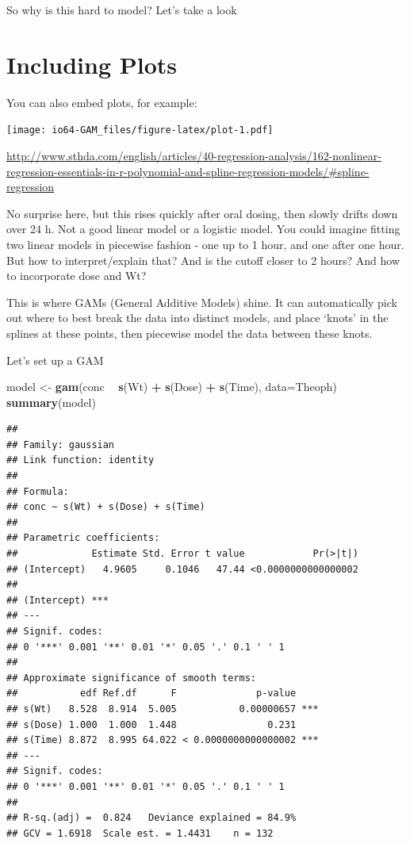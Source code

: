 \documentclass[
]{book}
\newenvironment{Shaded}{\begin{snugshade}}{\end{snugshade}}
\newcommand{\DataTypeTok}[1]{\textcolor[rgb]{0.13,0.29,0.53}{#1}}
\newcommand{\KeywordTok}[1]{\textcolor[rgb]{0.13,0.29,0.53}{\textbf{#1}}}
\newcommand{\NormalTok}[1]{#1}
\newcommand{\OperatorTok}[1]{\textcolor[rgb]{0.81,0.36,0.00}{\textbf{#1}}}
\newcommand{\StringTok}[1]{\textcolor[rgb]{0.31,0.60,0.02}{#1}}
\begin{document}
So why is this hard to model?
Let's take a look

\hypertarget{including-plots}{%
\section{Including Plots}\label{including-plots}}

You can also embed plots, for example:

\texttt{[image: io64-GAM\_files/figure-latex/plot-1.pdf]}

\url{http://www.sthda.com/english/articles/40-regression-analysis/162-nonlinear-regression-essentials-in-r-polynomial-and-spline-regression-models/\#spline-regression}

No surprise here, but this rises quickly after oral dosing, then slowly drifts down over 24 h. Not a good linear model or a logistic model.
You could imagine fitting two linear models in piecewise fashion - one up to 1 hour, and one after one hour.
But how to interpret/explain that?
And is the cutoff closer to 2 hours?
And how to incorporate dose and Wt?

This is where GAMs (General Additive Models) shine.
It can automatically pick out where to best break the data into distinct models, and place `knots' in the splines at these points, then piecewise model the data between these knots.

Let's set up a GAM

\begin{Shaded}
\begin{Highlighting}[]
\NormalTok{model <-}\StringTok{ }\KeywordTok{gam}\NormalTok{(conc }\OperatorTok{~}\StringTok{ }\KeywordTok{s}\NormalTok{(Wt) }\OperatorTok{+}\StringTok{ }\KeywordTok{s}\NormalTok{(Dose) }\OperatorTok{+}\StringTok{ }\KeywordTok{s}\NormalTok{(Time), }\DataTypeTok{data=}\NormalTok{Theoph)}
\KeywordTok{summary}\NormalTok{(model)}
\end{Highlighting}
\end{Shaded}

\begin{verbatim}
## 
## Family: gaussian 
## Link function: identity 
## 
## Formula:
## conc ~ s(Wt) + s(Dose) + s(Time)
## 
## Parametric coefficients:
##             Estimate Std. Error t value            Pr(>|t|)
## (Intercept)   4.9605     0.1046   47.44 <0.0000000000000002
##                
## (Intercept) ***
## ---
## Signif. codes:  
## 0 '***' 0.001 '**' 0.01 '*' 0.05 '.' 0.1 ' ' 1
## 
## Approximate significance of smooth terms:
##           edf Ref.df      F              p-value    
## s(Wt)   8.528  8.914  5.005           0.00000657 ***
## s(Dose) 1.000  1.000  1.448                0.231    
## s(Time) 8.872  8.995 64.022 < 0.0000000000000002 ***
## ---
## Signif. codes:  
## 0 '***' 0.001 '**' 0.01 '*' 0.05 '.' 0.1 ' ' 1
## 
## R-sq.(adj) =  0.824   Deviance explained = 84.9%
## GCV = 1.6918  Scale est. = 1.4431    n = 132
\end{verbatim}
\end{document}
